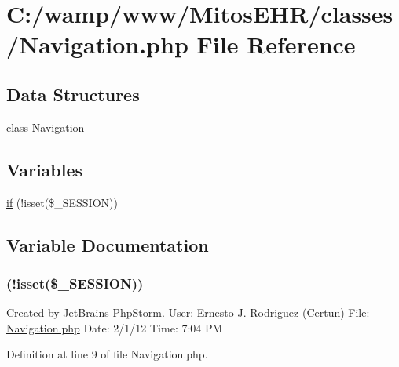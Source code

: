 \hypertarget{_navigation_8php}{\section{\-C\-:/wamp/www/\-Mitos\-E\-H\-R/classes/\-Navigation.php \-File \-Reference}
\label{_navigation_8php}
}
\subsection*{\-Data \-Structures}
\begin{DoxyCompactItemize}
\item 
class \hyperlink{class_navigation}{\-Navigation}
\end{DoxyCompactItemize}
\subsection*{\-Variables}
\begin{DoxyCompactItemize}
\item 
\hyperlink{_navigation_8php_a8ceca98aa29914fd2479a84a8d2242fb}{if} (!isset(\$\-\_\-\-S\-E\-S\-S\-I\-O\-N))
\end{DoxyCompactItemize}


\subsection{\-Variable \-Documentation}
\hypertarget{_navigation_8php_a8ceca98aa29914fd2479a84a8d2242fb}{
\subsubsection[{if}]{(!isset(\$\-\_\-\-S\-E\-S\-S\-I\-O\-N))}}\label{_navigation_8php_a8ceca98aa29914fd2479a84a8d2242fb}
\-Created by \-Jet\-Brains \-Php\-Storm. \hyperlink{class_user}{\-User}\-: \-Ernesto \-J. \-Rodriguez (\-Certun) \-File\-: \hyperlink{_navigation_8php}{\-Navigation.\-php} \-Date\-: 2/1/12 \-Time\-: 7\-:04 \-P\-M 

\-Definition at line 9 of file \-Navigation.\-php.

